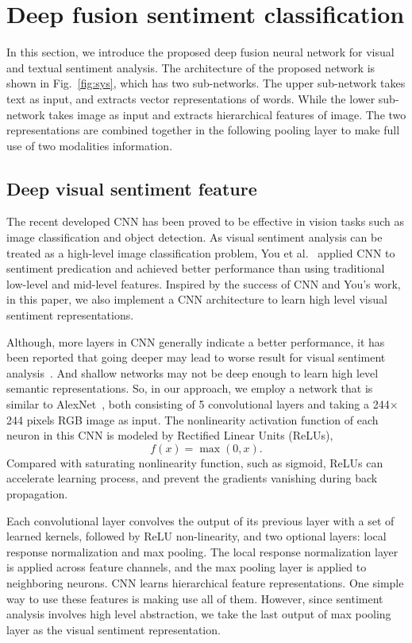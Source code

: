 \documentclass{article}
\begin{document}
\section{Deep fusion sentiment classification}
\label{sec:format}
In this section, we introduce the proposed deep fusion neural network for visual and textual sentiment analysis. The architecture of the proposed network is shown in Fig.~\ref{fig:sys}, which has two sub-networks. The upper sub-network takes text as input, and extracts vector representations of words. While the lower sub-network takes image as input and extracts hierarchical features of image. The two representations are combined together in the following pooling layer to make full use of two modalities information.

 \subsection{Deep visual sentiment feature}
 \label{ssec:subhead}
The recent developed CNN has been proved to be effective in vision tasks such as image classification and object detection. As visual sentiment analysis can be treated as a high-level image classification problem, You et al.~\cite{you2015robust} applied CNN to sentiment predication and achieved better performance than using traditional low-level and mid-level features. Inspired by the success of CNN and You's work, in this paper, we also implement a CNN architecture to learn high level visual sentiment representations.

Although, more layers in CNN generally indicate a better performance, it has been reported that going deeper may lead to worse result for visual sentiment analysis~\cite{you2015robust}. And shallow networks may not be deep enough to learn high level semantic representations. So, in our approach, we employ a network that is similar to AlexNet~\cite{krizhevsky2012imagenet}, both consisting of 5 convolutional layers and taking a 244$\times$244 pixels RGB image as input. The nonlinearity activation function of each neuron in this CNN is modeled by Rectified Linear Units (ReLUs),
   \begin{equation}
    f(x)=\max(0, x).
    \end{equation}
Compared with saturating nonlinearity function, such as sigmoid, ReLUs can accelerate learning process, and prevent the gradients vanishing during back propagation.

Each convolutional layer convolves the output of its previous layer with a set of learned kernels, followed by ReLU non-linearity, and two optional layers: local response normalization and max pooling. The local response normalization layer is applied across feature channels, and the max pooling layer is applied to neighboring neurons. CNN learns hierarchical feature representations. One simple way to use these features is making use all of them. However, since sentiment analysis involves high level abstraction, we take the last output of max pooling layer as the visual sentiment representation.
\end{document}
